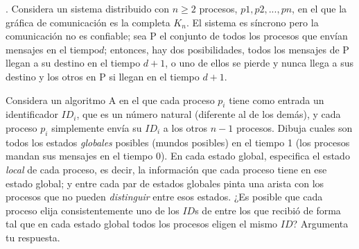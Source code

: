 . Considera un sistema distribuido con $n \geq 2$ procesos,
$p1, p2, . . . , pn$, en el que la gráfica de comunicación es
la completa $K_n$. El sistema es síncrono pero la comunicación
no es confiable; sea P el conjunto de todos los procesos que
envían mensajes en el tiempo$d$; entonces, hay dos posibilidades,
todos los mensajes de P llegan a su destino en el tiempo $d + 1$,
o uno de ellos se pierde y nunca llega a sus destino y los otros
en P si llegan en el tiempo $d + 1$.
\newline

Considera un algoritmo A en el que cada proceso $p_i$ tiene como
entrada un identificador $ID_i$, que es un número natural (diferente
al de los demás), y cada proceso $p_i$ simplemente envía su $ID_i$
a los otros $n - 1$ procesos. Dibuja cuales son todos los estados
\textit{globales} posibles (mundos posibles) en el tiempo 1 (los procesos
mandan sus mensajes en el tiempo 0). En cada estado global, especifica
el estado \textit{local} de cada proceso, es decir, la información que
cada proceso tiene en ese estado global; y entre cada par de estados
globales pinta una arista con los procesos que no pueden \textit{distinguir}
entre esos estados. ¿Es posible que cada proceso elija consistentemente
uno de los $ID$s de entre los que recibió de forma tal que en cada estado
global todos los procesos eligen el mismo $ID$? Argumenta tu respuesta.
